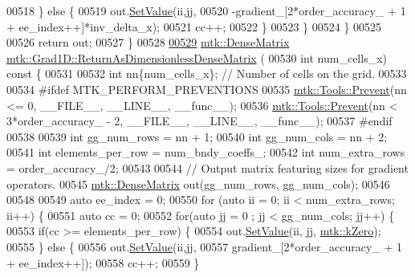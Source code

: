 \begin{DoxyCode}
{{00518       \} \textcolor{keywordflow}{else} \{
00519         out.\hyperlink{classmtk_1_1DenseMatrix_a784ce5784109ac86bfb9d8562b334b13}{SetValue}(ii,jj,
00520                     -gradient\_[2*order\_accuracy\_ + 1 + ee\_index++]*inv\_delta\_x);
00521         cc++;
00522       \}
00523      \}
00524   \}
00525 
00526   \textcolor{keywordflow}{return} out;
00527 \}
00528 
\hypertarget{mtk__grad__1d_8cc_source_l00529}{}\hyperlink{classmtk_1_1Grad1D_ab07e6a15edca32534ae3d1a8ccaf1c42}{00529} \hyperlink{classmtk_1_1DenseMatrix}{mtk::DenseMatrix} \hyperlink{classmtk_1_1Grad1D_ab07e6a15edca32534ae3d1a8ccaf1c42}{mtk::Grad1D::ReturnAsDimensionlessDenseMatrix}
      (
00530   \textcolor{keywordtype}{int} num\_cells\_x)\textcolor{keyword}{ const }\{
00531 
00532   \textcolor{keywordtype}{int} nn\{num\_cells\_x\}; \textcolor{comment}{// Number of cells on the grid.}
00533 
00534 \textcolor{preprocessor}{  #ifdef MTK\_PERFORM\_PREVENTIONS}
00535   \hyperlink{classmtk_1_1Tools_a332324c6f25e66be9dff48c5987a3b9f}{mtk::Tools::Prevent}(nn <= 0, \_\_FILE\_\_, \_\_LINE\_\_, \_\_func\_\_);
00536   \hyperlink{classmtk_1_1Tools_a332324c6f25e66be9dff48c5987a3b9f}{mtk::Tools::Prevent}(nn < 3*order\_accuracy\_ - 2, \_\_FILE\_\_, \_\_LINE\_\_, \_\_func\_\_);
00537 \textcolor{preprocessor}{  #endif}
00538 
00539   \textcolor{keywordtype}{int} gg\_num\_rows = nn + 1;
00540   \textcolor{keywordtype}{int} gg\_num\_cols = nn + 2;
00541   \textcolor{keywordtype}{int} elements\_per\_row = num\_bndy\_coeffs\_;
00542   \textcolor{keywordtype}{int} num\_extra\_rows = order\_accuracy\_/2;
00543 
00544   \textcolor{comment}{// Output matrix featuring sizes for gradient operators.}
00545   \hyperlink{classmtk_1_1DenseMatrix}{mtk::DenseMatrix} out(gg\_num\_rows, gg\_num\_cols);
00546 
00548 
00549   \textcolor{keyword}{auto} ee\_index = 0;
00550   \textcolor{keywordflow}{for} (\textcolor{keyword}{auto} ii = 0; ii < num\_extra\_rows; ii++) \{
00551     \textcolor{keyword}{auto} cc = 0;
00552     \textcolor{keywordflow}{for}(\textcolor{keyword}{auto} jj = 0 ; jj < gg\_num\_cols; jj++) \{
00553       \textcolor{keywordflow}{if}(cc >= elements\_per\_row) \{
00554         out.\hyperlink{classmtk_1_1DenseMatrix_a784ce5784109ac86bfb9d8562b334b13}{SetValue}(ii, jj, \hyperlink{group__c01-roots_ga59a451a5fae30d59649bcda274fea271}{mtk::kZero});
00555       \} \textcolor{keywordflow}{else} \{
00556         out.\hyperlink{classmtk_1_1DenseMatrix_a784ce5784109ac86bfb9d8562b334b13}{SetValue}(ii,jj,
00557                      gradient\_[2*order\_accuracy\_ + 1 + ee\_index++]);
00558         cc++;
00559       \}
}}
\end{DoxyCode}
